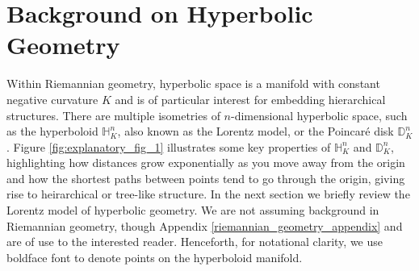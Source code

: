 \section{Background on Hyperbolic Geometry}\label{sec:background}

Within Riemannian geometry, hyperbolic space is a manifold with constant negative curvature $K$ and is of particular interest for embedding hierarchical structures. There are multiple isometries of $n$-dimensional hyperbolic space, such as the hyperboloid $\mathbb{H}_K^n$, also known as the Lorentz model, or the Poincar\'e disk $\mathbb{D}_K^n$. Figure \ref{fig:explanatory_fig_1} illustrates some key properties of $\mathbb{H}_K^n$ and $\mathbb{D}_K^n$, highlighting how distances grow exponentially as you move away from the origin and how the shortest paths between points tend to go through the origin, giving rise to heirarchical or tree-like structure. %
In the next section we briefly review the Lorentz model of hyperbolic geometry. We are not assuming background in Riemannian geometry, though Appendix \ref{riemannian_geometry_appendix} and \citet{Ratcliffe94} are of use to the interested reader. Henceforth, for notational clarity, we use boldface font to denote points on the hyperboloid manifold.



